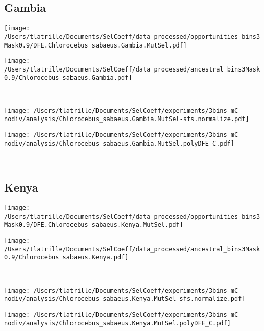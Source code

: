 \documentclass{article}
\begin{document}
    \subsection{Gambia}

    \begin{minipage}{0.49\linewidth}
        \texttt{[image: /Users/tlatrille/Documents/SelCoeff/data\_processed/opportunities\_bins3Mask0.9/DFE.Chlorocebus\_sabaeus.Gambia.MutSel.pdf]}
    \end{minipage}
    \begin{minipage}{0.49\linewidth}
        \texttt{[image: /Users/tlatrille/Documents/SelCoeff/data\_processed/ancestral\_bins3Mask0.9/Chlorocebus\_sabaeus.Gambia.pdf]}
    \end{minipage}
    \\
    \begin{minipage}{0.49\linewidth}
        \texttt{[image: /Users/tlatrille/Documents/SelCoeff/experiments/3bins-mC-nodiv/analysis/Chlorocebus\_sabaeus.Gambia.MutSel-sfs.normalize.pdf]}
    \end{minipage}
    \begin{minipage}{0.49\linewidth}
        \texttt{[image: /Users/tlatrille/Documents/SelCoeff/experiments/3bins-mC-nodiv/analysis/Chlorocebus\_sabaeus.Gambia.MutSel.polyDFE\_C.pdf]}
    \end{minipage}
    \\
    \subsection{Kenya}

    \begin{minipage}{0.49\linewidth}
        \texttt{[image: /Users/tlatrille/Documents/SelCoeff/data\_processed/opportunities\_bins3Mask0.9/DFE.Chlorocebus\_sabaeus.Kenya.MutSel.pdf]}
    \end{minipage}
    \begin{minipage}{0.49\linewidth}
        \texttt{[image: /Users/tlatrille/Documents/SelCoeff/data\_processed/ancestral\_bins3Mask0.9/Chlorocebus\_sabaeus.Kenya.pdf]}
    \end{minipage}
    \\
    \begin{minipage}{0.49\linewidth}
        \texttt{[image: /Users/tlatrille/Documents/SelCoeff/experiments/3bins-mC-nodiv/analysis/Chlorocebus\_sabaeus.Kenya.MutSel-sfs.normalize.pdf]}
    \end{minipage}
    \begin{minipage}{0.49\linewidth}
        \texttt{[image: /Users/tlatrille/Documents/SelCoeff/experiments/3bins-mC-nodiv/analysis/Chlorocebus\_sabaeus.Kenya.MutSel.polyDFE\_C.pdf]}
    \end{minipage}
    \\
\end{document}

